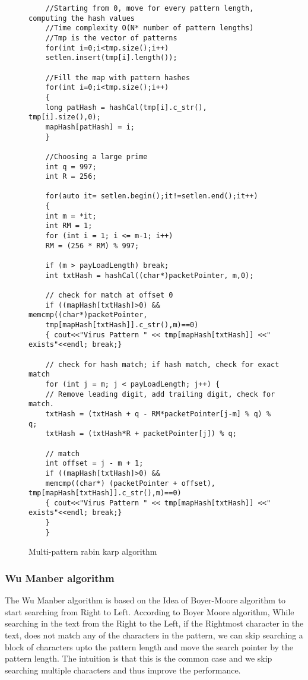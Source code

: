 \begin{figure}
	\centering
	\begin{lstlisting}
	//Starting from 0, move for every pattern length, computing the hash values
	//Time complexity O(N* number of pattern lengths)
	//Tmp is the vector of patterns
	for(int i=0;i<tmp.size();i++)
	setlen.insert(tmp[i].length());
	
	//Fill the map with pattern hashes
	for(int i=0;i<tmp.size();i++)
	{
	long patHash = hashCal(tmp[i].c_str(), tmp[i].size(),0);
	mapHash[patHash] = i;
	}
	
	//Choosing a large prime
	int q = 997; 
	int R = 256;
	
	for(auto it= setlen.begin();it!=setlen.end();it++)
	{
	int m = *it;
	int RM = 1;
	for (int i = 1; i <= m-1; i++)
	RM = (256 * RM) % 997;
	
	if (m > payLoadLength) break;
	int txtHash = hashCal((char*)packetPointer, m,0);
	
	// check for match at offset 0
	if ((mapHash[txtHash]>0) && memcmp((char*)packetPointer,
	tmp[mapHash[txtHash]].c_str(),m)==0)
	{ cout<<"Virus Pattern " << tmp[mapHash[txtHash]] <<" exists"<<endl; break;}
	
	// check for hash match; if hash match, check for exact match
	for (int j = m; j < payLoadLength; j++) {
	// Remove leading digit, add trailing digit, check for match.
	txtHash = (txtHash + q - RM*packetPointer[j-m] % q) % q;
	txtHash = (txtHash*R + packetPointer[j]) % q;
	
	// match
	int offset = j - m + 1;
	if ((mapHash[txtHash]>0) &&
	memcmp((char*) (packetPointer + offset), tmp[mapHash[txtHash]].c_str(),m)==0)
	{ cout<<"Virus Pattern " << tmp[mapHash[txtHash]] <<" exists"<<endl; break;}
	}
	}
	\end{lstlisting}
	\caption{Multi-pattern rabin karp algorithm}
	\label{fig:multirabinkarp}
\end{figure}

\subsubsection{Wu Manber algorithm}
The Wu Manber algorithm is based on the Idea of Boyer-Moore algorithm to start searching from Right to Left. According to Boyer Moore algorithm, While searching in the text from the Right to the Left, if the Rightmost character in the text, does not match any of the characters in the pattern, we can skip searching a block of characters upto the pattern length and move the search pointer by the pattern length. The intuition is that this is the common case and we skip searching multiple characters and thus improve the performance.

